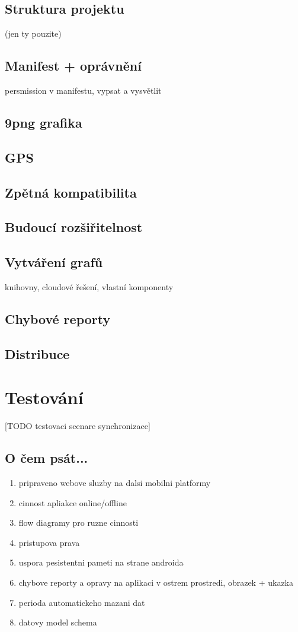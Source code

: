 \documentclass{diplomka}
\begin{document}
\section{Struktura projektu}
(jen ty pouzite)

\section{Manifest + oprávnění}
persmission v manifestu, vypsat a vysvětlit

\section{9png grafika}

\section{GPS}

\section{Zpětná kompatibilita}

\section{Budoucí rozšiřitelnost}

\section{Vytváření grafů}
knihovny, cloudové řešení, vlastní komponenty

\section{Chybové reporty}

\section{Distribuce}

\chapter{Testování}
[TODO testovaci scenare synchronizace]
\section{O čem psát...}
\begin{enumerate}
\item pripraveno webove sluzby na dalsi mobilni platformy
\item cinnost apliakce online/offline
\item flow diagramy pro ruzne cinnosti
\item pristupova prava
\item uspora pesistentni pameti na strane androida
\item chybove reporty a opravy na aplikaci v ostrem prostredi, obrazek + ukazka
\item perioda automatickeho mazani dat
\item datovy model schema
\end{enumerate}
\end{document}
